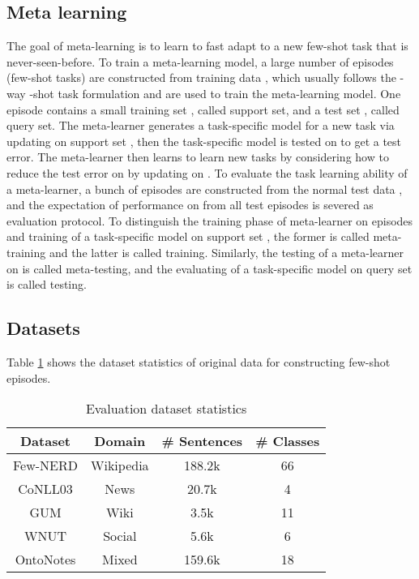 \documentclass[11pt]{article}
\begin{document}
\subsection{Meta learning}
\label{sec:meta}
The goal of meta-learning is to learn to fast adapt to a new few-shot task that is never-seen-before. To train a meta-learning model, a large number of episodes  (few-shot tasks) are constructed from training data , which usually follows the -way -shot task formulation and are used to train the meta-learning model. One episode contains a small training set , called support set, and a test set , called query set. The meta-learner generates a task-specific model for a new task  via updating on support set , then the task-specific model is tested on  to get a test error. The meta-learner then learns to learn new tasks by considering how to reduce the test error on  by updating on .  To evaluate the task learning ability of a meta-learner, a bunch of episodes  are constructed from the normal test data , and the expectation of performance on  from all test episodes is severed as evaluation protocol. To distinguish the training phase of meta-learner on episodes  and training of a task-specific model on support set , the former is called meta-training and the latter is called training. Similarly, the testing of a meta-learner on  is called meta-testing, and the evaluating of a task-specific model on query set  is called testing.





\subsection{Datasets}
\label{sec:dataset}
Table \ref{tab:dataset-statistic} shows the dataset statistics of original data for constructing few-shot episodes. 

\begin{table}[htbp]
    \centering
    \small
    \begin{tabular}{cccc}
    \toprule
       \textbf{Dataset}  & \textbf{Domain} & \textbf{\# Sentences} & \textbf{\# Classes} \\
     \midrule
       Few-NERD  & Wikipedia & 188.2k & 66 \\
       CoNLL03 & News & 20.7k & 4 \\
       GUM & Wiki & 3.5k & 11 \\
       WNUT & Social & 5.6k & 6 \\
       OntoNotes & Mixed & 159.6k & 18 \\
     \bottomrule
    \end{tabular}
    \caption{Evaluation dataset statistics}
    \label{tab:dataset-statistic}
\end{table}
\end{document}
